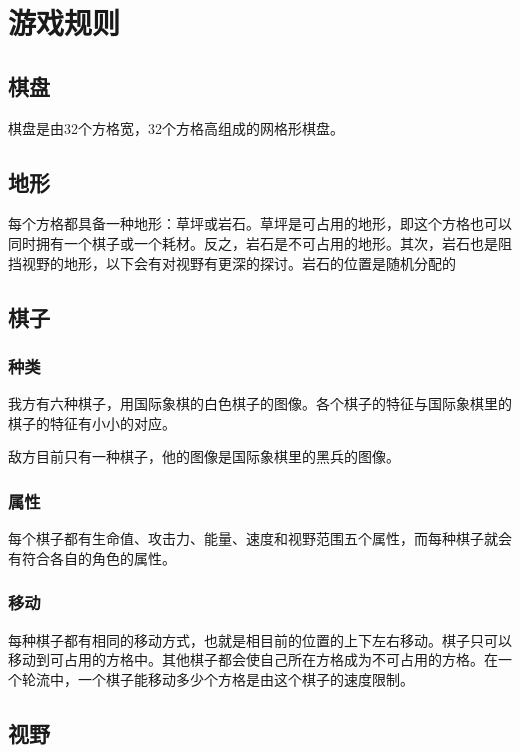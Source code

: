 \section{游戏规则}

\subsection{棋盘}

棋盘是由32个方格宽，32个方格高组成的网格形棋盘。

\subsection{地形}

每个方格都具备一种地形：草坪或岩石。草坪是可占用的地形，即这个方格也可以同时拥有一个棋子或一个耗材。反之，岩石是不可占用的地形。其次，岩石也是阻挡视野的地形，以下会有对视野有更深的探讨。岩石的位置是随机分配的

\subsection{棋子}

\subsubsection{种类}

我方有六种棋子，用国际象棋的白色棋子的图像。各个棋子的特征与国际象棋里的棋子的特征有小小的对应。

敌方目前只有一种棋子，他的图像是国际象棋里的黑兵的图像。

\subsubsection{属性}

每个棋子都有生命值、攻击⼒、能量、速度和视野范围五个属性，而每种棋子就会有符合各自的角色的属性。

\subsubsection{移动}

每种棋子都有相同的移动方式，也就是相目前的位置的上下左右移动。棋子只可以移动到可占用的方格中。其他棋子都会使自己所在方格成为不可占用的方格。在一个轮流中，一个棋子能移动多少个方格是由这个棋子的速度限制。

\subsection{视野}

